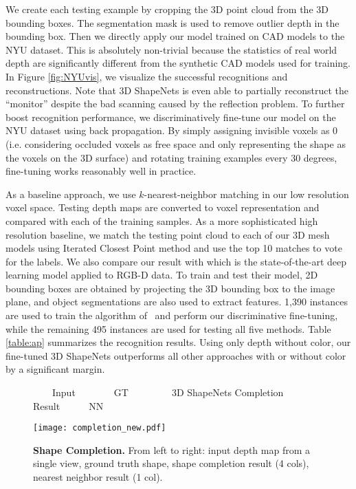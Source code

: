 \documentclass[10pt,twocolumn,letterpaper]{article}
\begin{document}
We create each testing example by cropping the 3D point cloud from the 3D bounding boxes. 
The segmentation mask is used to remove outlier depth in the bounding box.
Then we directly apply our model trained on CAD models to the NYU dataset. This is absolutely non-trivial because the statistics of real world depth are significantly different from the synthetic CAD models used for training. In Figure \ref{fig:NYUvis}, we visualize the successful recognitions and reconstructions. Note that 3D ShapeNets is even able to partially reconstruct the ``monitor'' despite the bad scanning caused by the reflection problem. To further boost recognition performance, we discriminatively fine-tune our model on the NYU dataset
using back propagation. 
By simply assigning invisible voxels as 0 (i.e. considering occluded voxels as free space and only representing the shape as the voxels on the 3D surface) and rotating training examples every 30 degrees, fine-tuning works reasonably well in practice.






As a baseline approach, we use $k$-nearest-neighbor matching in our low resolution voxel space. Testing depth maps are converted to voxel representation and compared with each of the training samples.
As a more sophisticated high resolution baseline, we match the testing point cloud to each of our 3D mesh models using Iterated Closest Point method \cite{ICP} and use the top 10 matches to vote for the labels. 
We also compare our result with \cite{Socher} which is the state-of-the-art deep learning model applied to RGB-D data. 
To train and test their model, 2D bounding boxes are obtained by projecting the 3D bounding box to the image plane, and object segmentations are also used to extract features. 
1,390 instances are used to train the algorithm of~\cite{Socher} and perform our discriminative fine-tuning, while the remaining 495 instances
are used for testing all five methods. 
Table \ref{table:ap} summarizes the recognition results. 
Using only depth without color,
our fine-tuned 3D ShapeNets outperforms all other approaches with or without color by a significant margin.





\begin{figure}[t]
\vspace{-2mm}

{\small
~~~~Input~~~~~~~~GT~~~~~~~~~3D ShapeNets Completion Result~~~~~~NN
}

\vspace{-0.5mm}
\centering
\texttt{[image: completion\_new.pdf]}

\vspace{-3mm}
\caption{{\bf Shape Completion.} From left to right: input depth map from a single view, ground truth shape, shape completion result (4 cols), nearest neighbor result (1 col).}
\label{fig:shapecompletion}
\vspace{-3mm}
\end{figure}
\end{document}
